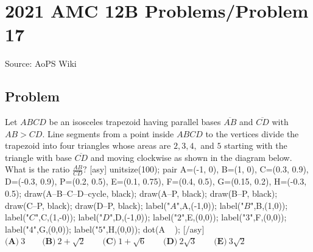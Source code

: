 \documentclass[12pt]{article}
\begin{document}
\section*{{2021 AMC 12B Problems/Problem 17}}
Source: AoPS Wiki

\subsection*{Problem}
Let $ABCD$ be an isosceles trapezoid having parallel bases $\overline{AB}$ and $\overline{CD}$ with $AB>CD.$ Line segments from a point inside $ABCD$ to the vertices divide the trapezoid into four triangles whose areas are $2, 3, 4,$ and $5$ starting with the triangle with base $\overline{CD}$ and moving clockwise as shown in the diagram below. What is the ratio $\frac{AB}{CD}?$ [asy] unitsize(100); pair A=(-1, 0), B=(1, 0), C=(0.3, 0.9), D=(-0.3, 0.9), P=(0.2, 0.5), E=(0.1, 0.75), F=(0.4, 0.5), G=(0.15, 0.2), H=(-0.3, 0.5); draw(A--B--C--D--cycle, black); draw(A--P, black); draw(B--P, black); draw(C--P, black); draw(D--P, black); label("$A$",A,(-1,0)); label("$B$",B,(1,0)); label("$C$",C,(1,-0)); label("$D$",D,(-1,0)); label("$2$",E,(0,0)); label("$3$",F,(0,0)); label("$4$",G,(0,0)); label("$5$",H,(0,0)); dot(A^^B^^C^^D^^P); [/asy] $\textbf{(A)}\: 3\qquad\textbf{(B)}\: 2+\sqrt{2}\qquad\textbf{(C)}\: 1+\sqrt{6}\qquad\textbf{(D)}\: 2\sqrt{3}\qquad\textbf{(E)}\: 3\sqrt{2}$
\end{document}
